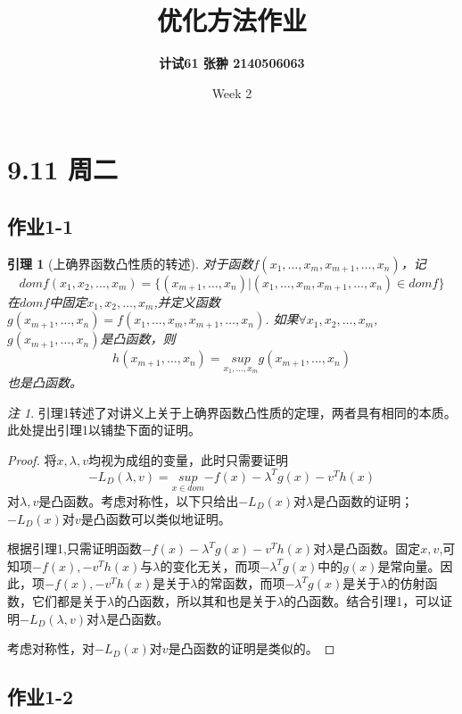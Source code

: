 \documentclass[UTF8]{ctexart}
\title{\Large \textbf{优化方法作业}}
\author{\textbf{计试61 张翀 2140506063}}
\date{Week 2}
\newtheorem{lem}[thm]{引理}
\theoremstyle{Defination}
\theoremstyle{remark}
\newtheorem{rem}{注}
\begin{document}
\maketitle



\section*{9.11 周二}

\subsection*{作业1-1}

\begin{lem}[上确界函数凸性质的转述]
对于函数$f(x_1,\dots,x_m,x_{m+1},\dots,x_n)$，记$$dom f(x_1,x_2,\dots,x_m)=\{(x_{m+1},\dots,x_n)|(x_1,\dots,x_m,x_{m+1},\dots,x_n)\in dom f\}$$
在$dom f$中固定$x_1,x_2,\dots,x_m$,并定义函数$g(x_{m+1},\dots,x_n)=f(x_1,\dots,x_m,x_{m+1},\dots,x_n)$.
如果$\forall x_1,x_2,\dots,x_m$,$g(x_{m+1},\dots,x_n)$是凸函数，则
$$h(x_{m+1},\dots,x_n)=\underset{x_1,\dots,x_m}{sup}{g(x_{m+1},\dots,x_n)}$$
也是凸函数。
\end{lem}

\begin{rem}
引理1转述了对讲义上关于上确界函数凸性质的定理，两者具有相同的本质。此处提出引理1以铺垫下面的证明。
\end{rem}

\begin{proof}
将$x,\lambda,v$均视为成组的变量，此时只需要证明$$-L_D(\lambda,v)=\underset{x\in dom}{sup}{-f(x)-\lambda^Tg(x)-v^Th(x)}$$对$\lambda,v$是凸函数。考虑对称性，以下只给出$-L_D(x)$对$\lambda$是凸函数的证明；$-L_D(x)$对$v$是凸函数可以类似地证明。

根据引理1,只需证明函数$-f(x)-\lambda^Tg(x)-v^Th(x)$对$\lambda$是凸函数。固定$x,v$,可知项$-f(x),-v^Th(x)$与$\lambda$的变化无关，而项$-\lambda^Tg(x)$中的$g(x)$是常向量。因此，项$-f(x),-v^Th(x)$是关于$\lambda$的常函数，而项$-\lambda^Tg(x)$是关于$\lambda$的仿射函数，它们都是关于$\lambda$的凸函数，所以其和也是关于$\lambda$的凸函数。结合引理1，可以证明$-L_D(\lambda,v)$对$\lambda$是凸函数。

考虑对称性，对$-L_D(x)$对$v$是凸函数的证明是类似的。
\end{proof}


\subsection*{作业1-2}
\end{document}
